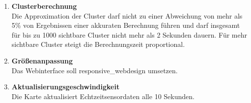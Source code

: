 \begin{enumerate}[label=\textbf{NF\arabic{enumi}0}]
	\item \textbf{Clusterberechnung}\\
	Die Approximation der Cluster darf nicht zu einer Abweichung von mehr als 5\% von Ergebnissen einer akkuraten Berechnung führen und darf insgesamt für bis zu 1000 sichtbare Cluster nicht mehr als 2 Sekunden dauern. Für mehr sichtbare Cluster steigt die Berechnungszeit proportional. %
	
	\item \textbf{Größenanpassung}\\
	Das Webinterface soll \Gls{responsive_webdesign} umsetzen.
	
	\item \textbf{Aktualisierungsgeschwindigkeit}\\
	Die Karte aktualisiert Echtzeitsensordaten alle 10 Sekunden. %

\end{enumerate}
	